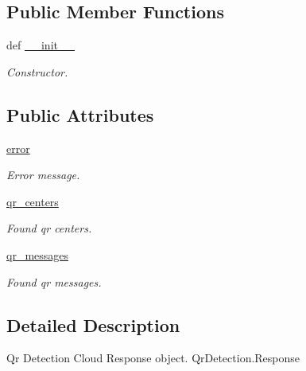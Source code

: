 \subsection*{Public Member Functions}
\begin{DoxyCompactItemize}
\item 
def \hyperlink{classRappCloud_1_1CloudMsgs_1_1QrDetection_1_1QrDetection_1_1Response_a95e3644f66641de090b914e9e4d5f40d}{\-\_\-\-\_\-init\-\_\-\-\_\-}
\begin{DoxyCompactList}\small\item\em Constructor. \end{DoxyCompactList}\end{DoxyCompactItemize}
\subsection*{Public Attributes}
\begin{DoxyCompactItemize}
\item 
\hyperlink{classRappCloud_1_1CloudMsgs_1_1QrDetection_1_1QrDetection_1_1Response_add345b2531caa7c32c21c7dd75d66546}{error}
\begin{DoxyCompactList}\small\item\em Error message. \end{DoxyCompactList}\item 
\hyperlink{classRappCloud_1_1CloudMsgs_1_1QrDetection_1_1QrDetection_1_1Response_aaf7ee44d0b6dae2f5d69b841dfb20008}{qr\-\_\-centers}
\begin{DoxyCompactList}\small\item\em Found qr centers. \end{DoxyCompactList}\item 
\hyperlink{classRappCloud_1_1CloudMsgs_1_1QrDetection_1_1QrDetection_1_1Response_a651d1c714f77200d64119da613dea096}{qr\-\_\-messages}
\begin{DoxyCompactList}\small\item\em Found qr messages. \end{DoxyCompactList}\end{DoxyCompactItemize}


\subsection{Detailed Description}
\begin{DoxyVerb}Qr Detection Cloud Response object. QrDetection.Response \end{DoxyVerb}
 


